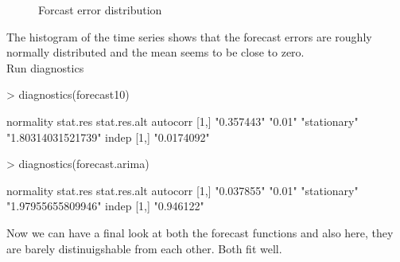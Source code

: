 \documentclass[11pt, a4paper]{article} %
\begin{document}
\begin{figure}[ht]
\begin{center}
\qquad
{}
\end{center}
\caption{Forcast error distribution}
\label{forerr}
\end{figure}

\noindent The histogram of the time series shows that the forecast errors are roughly normally distributed and the mean seems to be close to zero.\\

Run diagnostics
\begin{Schunk}
\begin{Sinput}
> diagnostics(forecast10)
\end{Sinput}
\begin{Soutput}
     normality  stat.res stat.res.alt autocorr          
[1,] "0.357443" "0.01"   "stationary" "1.80314031521739"
     indep      
[1,] "0.0174092"
\end{Soutput}
\begin{Sinput}
> diagnostics(forecast.arima)
\end{Sinput}
\begin{Soutput}
     normality  stat.res stat.res.alt autocorr          
[1,] "0.037855" "0.01"   "stationary" "1.97955655809946"
     indep     
[1,] "0.946122"
\end{Soutput}
\end{Schunk}
\linebreak

\noindent Now we can have a final look at both the forecast functions and also here, they are barely distinuigshable from each other. Both fit well. 
\end{document}
